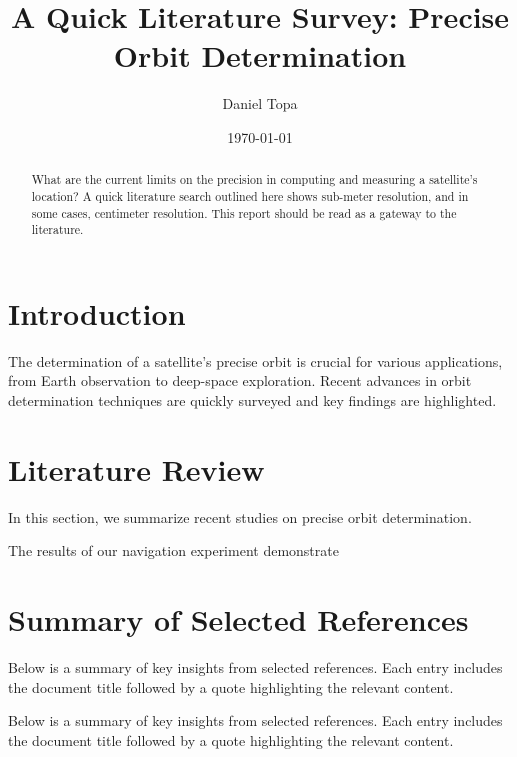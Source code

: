 \documentclass[a4paper,10pt]{article}
\title{A Quick Literature Survey: Precise Orbit Determination}
\author{Daniel Topa}
\date{\today}
\begin{document}
\maketitle

\begin{abstract}
What are the current limits on the precision in computing and measuring a satellite's location? A quick literature search outlined here shows sub-meter resolution, and in some cases, centimeter resolution. This report should be read as a gateway to the literature.
\end{abstract}
\tableofcontents
\section{Introduction}
The determination of a satellite's precise orbit is crucial for various applications, from Earth observation to deep-space exploration. Recent advances in orbit determination techniques are quickly surveyed and key findings are highlighted.

\section{Literature Review}
In this section, we summarize recent studies on precise orbit determination.

The results of our navigation experiment demonstrate

\section{Summary of Selected References}

\noindent Below is a summary of key insights from selected references. Each entry includes the document title followed by a quote highlighting the relevant content.

Below is a summary of key insights from selected references. Each entry includes the document title followed by a quote highlighting the relevant content.
\end{document}
